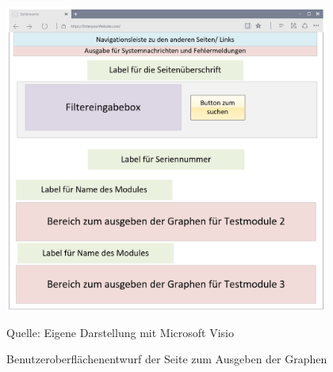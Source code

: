 \begin{figure}[H]
    \centering
    \includegraphics[width=0.95\textwidth]{Grafiken/Overlay_Ausgabeseite}
    \caption{Benutzeroberflächenentwurf der Seite zum Ausgeben der Graphen}
    \label{fig: Benutzeroberflächenentwurf der Seite zum Ausgeben der Graphen}
    {Quelle: Eigene Darstellung mit Microsoft Visio}
\end{figure}
















